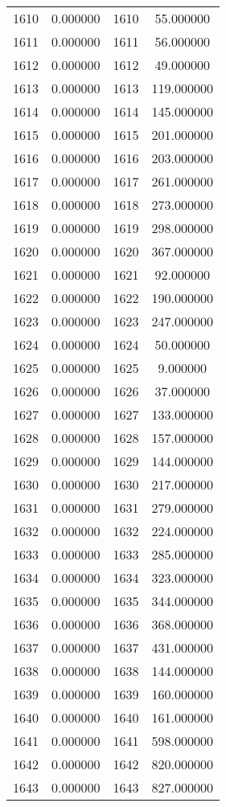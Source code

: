 \documentclass[12pt]{article}
\begin{document}
\begin{longtable}{@{}cccc@{}}
1610 & 0.000000 & 1610 & 55.000000 \\
1611 & 0.000000 & 1611 & 56.000000 \\
1612 & 0.000000 & 1612 & 49.000000 \\
1613 & 0.000000 & 1613 & 119.000000 \\
1614 & 0.000000 & 1614 & 145.000000 \\
1615 & 0.000000 & 1615 & 201.000000 \\
1616 & 0.000000 & 1616 & 203.000000 \\
1617 & 0.000000 & 1617 & 261.000000 \\
1618 & 0.000000 & 1618 & 273.000000 \\
1619 & 0.000000 & 1619 & 298.000000 \\
1620 & 0.000000 & 1620 & 367.000000 \\
1621 & 0.000000 & 1621 & 92.000000 \\
1622 & 0.000000 & 1622 & 190.000000 \\
1623 & 0.000000 & 1623 & 247.000000 \\
1624 & 0.000000 & 1624 & 50.000000 \\
1625 & 0.000000 & 1625 & 9.000000 \\
1626 & 0.000000 & 1626 & 37.000000 \\
1627 & 0.000000 & 1627 & 133.000000 \\
1628 & 0.000000 & 1628 & 157.000000 \\
1629 & 0.000000 & 1629 & 144.000000 \\
1630 & 0.000000 & 1630 & 217.000000 \\
1631 & 0.000000 & 1631 & 279.000000 \\
1632 & 0.000000 & 1632 & 224.000000 \\
1633 & 0.000000 & 1633 & 285.000000 \\
1634 & 0.000000 & 1634 & 323.000000 \\
1635 & 0.000000 & 1635 & 344.000000 \\
1636 & 0.000000 & 1636 & 368.000000 \\
1637 & 0.000000 & 1637 & 431.000000 \\
1638 & 0.000000 & 1638 & 144.000000 \\
1639 & 0.000000 & 1639 & 160.000000 \\
1640 & 0.000000 & 1640 & 161.000000 \\
1641 & 0.000000 & 1641 & 598.000000 \\
1642 & 0.000000 & 1642 & 820.000000 \\
1643 & 0.000000 & 1643 & 827.000000 \\

\end{longtable}
\end{document}
